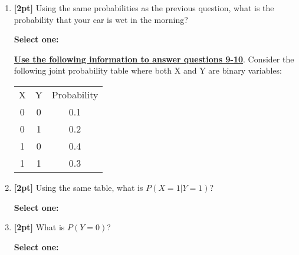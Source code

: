 \documentclass[12pt]{article}
\renewcommand{\circle}{\tikz\draw[black] (0,0) circle (1ex);}
\begin{document}
\begin{enumerate}
    \item \textbf{[2pt]} Using the same probabilities as the previous question, what is the probability that your car is wet in the morning?

    \textbf{Select one:}

    
    \bigskip\bigskip\bigskip
    \textbf{\underline{Use the following information to answer questions 9-10}}. Consider the following joint probability table where both X and Y are binary variables:\\[12pt] 
    \begin{tabular}{ccc}
    X & Y & Probability \\
    0 & 0 & 0.1\\
    0 & 1 & 0.2\\
    1 & 0 & 0.4\\
    1 & 1 & 0.3
    \end{tabular}


    \item \textbf{[2pt]} Using the same table, what is $P(X = 1 | Y=1)$?

    \textbf{Select one:}


\clearpage
    \item \textbf{[2pt]} What is $P(Y=0)$?

    \textbf{Select one:}

    
    

\end{enumerate}
\end{document}
